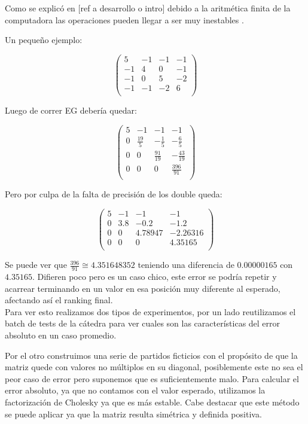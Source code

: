 Como se explicó en [ref a desarrollo o intro] debido a la aritmética finita de la computadora %
las operaciones pueden llegar a ser muy inestables \cite{arithmetic}.

Un pequeño ejemplo:

$$\begin{pmatrix}
    5 & -1 & -1 & -1 \\
    -1 & 4 & 0 & -1 \\
    -1 & 0 & 5 & -2 \\
    -1 & -1 & -2 & 6 \\
\end{pmatrix}$$

Luego de correr EG debería quedar:

$$\begin{pmatrix}
    5 & -1 & -1 & -1 \\
    0 & \frac{19}{5} & -\frac{1}{5} & -\frac{6}{5} \\
    0 & 0 & \frac{91}{19} & -\frac{43}{19} \\
    0 & 0 & 0 & \frac{396}{91} \\
\end{pmatrix}$$

Pero por culpa de la falta de precisión de los double queda: %

$$\begin{pmatrix}
    5 & -1 & -1 & -1 \\
    0 & 3.8 & -0.2 & -1.2 \\
    0 & 0 & 4.78947 & -2.26316 \\
    0 & 0 & 0 & 4.35165 \\
\end{pmatrix}$$

Se puede ver que $\frac{396}{91} \cong 4.351648352$ teniendo una diferencia de $0.00000165$ con $4.35165$.
Difieren poco pero es un caso chico, este error se podría repetir y acarrear terminando en un valor en esa posición muy diferente al esperado, afectando así el ranking final.\\

Para ver esto realizamos dos tipos de experimentos, por un lado reutilizamos el batch de tests de la cátedra para ver cuales son las características del error absoluto en un caso promedio.

Por el otro construimos una serie de partidos ficticios con el propósito de que la matriz quede con valores no múltiplos en su diagonal, posiblemente este no sea el peor caso de error pero suponemos que es suficientemente malo. Para calcular el error absoluto, ya que no contamos con el valor esperado, utilizamos la factorización de Cholesky ya que es más estable. Cabe destacar que este método se puede aplicar ya que la matriz resulta simétrica y definida positiva\cite{CMMpaper}.%
